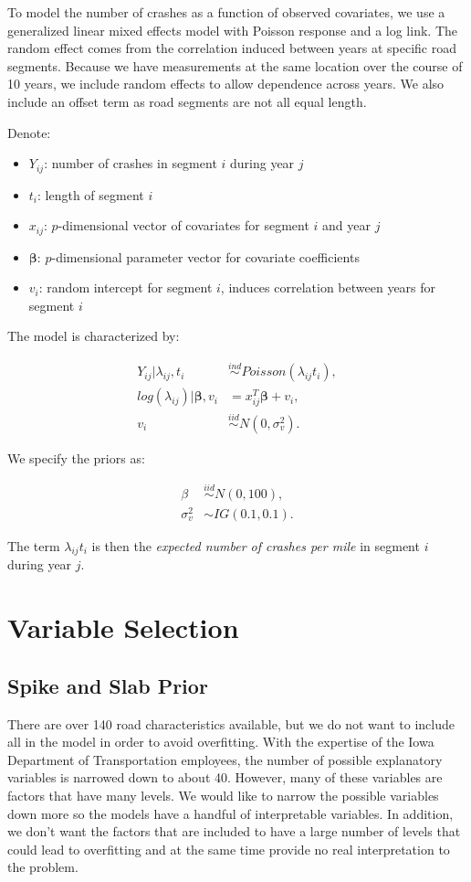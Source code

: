 \documentclass[a4paper]{article}\usepackage[]{graphicx}\usepackage[]{color}
\begin{document}
To model the number of crashes as a function of observed covariates, we use a generalized linear mixed effects model with Poisson response and a log link. The random effect comes from the correlation induced between years at specific road segments. Because we have measurements at the same location over the course of 10 years, we include random effects to allow dependence across years. We also include an offset term as road segments are not all equal length. 

Denote:

\begin{itemize}
\item
$Y_{ij}$: number of crashes in segment $i$ during year $j$
\item
$t_i$: length of segment $i$
\item
$x_{ij}$: $p$-dimensional vector of covariates for segment $i$ and year $j$
\item
$\boldsymbol{\beta}$: $p$-dimensional parameter vector for covariate coefficients
\item
$v_i$: random intercept for segment $i$, induces correlation between years for segment $i$
\end{itemize}

The model is characterized by:

\begin{align*}
Y_{ij}|\lambda_{ij},t_i &\overset{ind}{\sim} Poisson(\lambda_{ij}t_i),\\
log(\lambda_{ij})|\boldsymbol{\beta},v_i &= x_{ij}^T \boldsymbol{\beta} + v_i, \\
v_i &\overset{iid}{\sim} N(0,\sigma_v^2).
\end{align*}

We specify the priors as:

\begin{align*}
\beta &\overset{iid}{\sim} N(0,100),\\
\sigma_v^2 &\sim IG(0.1,0.1).
\end{align*}

The term $\lambda_{ij}t_i$ is then the \emph{expected number of crashes per mile} in segment $i$ during year $j$.

\section{Variable Selection}

\subsection{Spike and Slab Prior}
There are over 140 road characteristics available, but we do not want to include all in the model in order to avoid overfitting. With the expertise of the Iowa Department of Transportation employees, the number of possible explanatory variables is narrowed down to about 40. However, many of these variables are factors that have many levels. We would like to narrow the possible variables down more so the models have a handful of interpretable variables. In addition, we don't want the factors that are included to have a large number of levels that could lead to overfitting and at the same time provide no real interpretation to the problem.
\end{document}
